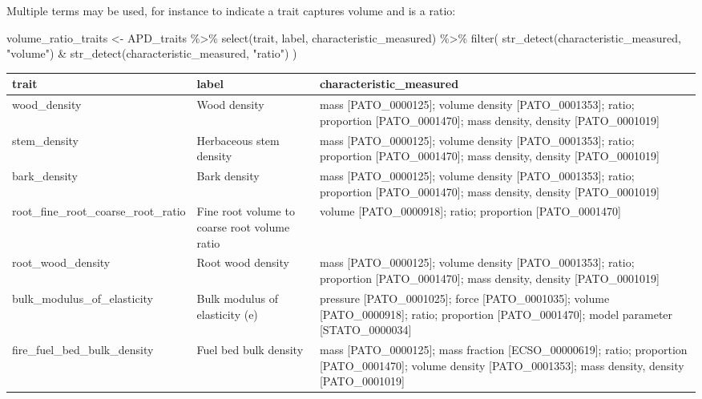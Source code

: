 \documentclass[
  letterpaper,
  DIV=11,
  numbers=noendperiod]{scrartcl}
\newenvironment{Shaded}{\begin{snugshade}}{\end{snugshade}}
\newcommand{\FunctionTok}[1]{\textcolor[rgb]{0.28,0.35,0.67}{#1}}
\newcommand{\NormalTok}[1]{\textcolor[rgb]{0.00,0.23,0.31}{#1}}
\newcommand{\OtherTok}[1]{\textcolor[rgb]{0.00,0.23,0.31}{#1}}
\newcommand{\SpecialCharTok}[1]{\textcolor[rgb]{0.37,0.37,0.37}{#1}}
\newcommand{\StringTok}[1]{\textcolor[rgb]{0.13,0.47,0.30}{#1}}
\begin{document}
Multiple terms may be used, for instance to indicate a trait captures
volume and is a ratio:

\begin{Shaded}
\begin{Highlighting}[]
\NormalTok{volume\_ratio\_traits }\OtherTok{\textless{}{-}} 
\NormalTok{  APD\_traits }\SpecialCharTok{\%\textgreater{}\%}
  \FunctionTok{select}\NormalTok{(trait, label, characteristic\_measured) }\SpecialCharTok{\%\textgreater{}\%}
  \FunctionTok{filter}\NormalTok{(}
    \FunctionTok{str\_detect}\NormalTok{(characteristic\_measured, }\StringTok{"volume"}\NormalTok{) }\SpecialCharTok{\&}
    \FunctionTok{str\_detect}\NormalTok{(characteristic\_measured, }\StringTok{"ratio"}\NormalTok{) }
\NormalTok{    )}
\end{Highlighting}
\end{Shaded}

\begin{tabular}{>{\raggedright\arraybackslash}p{6cm}>{\raggedright\arraybackslash}p{4cm}>{\raggedright\arraybackslash}p{5cm}}
\toprule
trait & label & characteristic\_measured\\
\midrule
wood\_density & Wood density & mass [PATO\_0000125]; volume density [PATO\_0001353]; ratio; proportion [PATO\_0001470]; mass density, density [PATO\_0001019]\\
stem\_density & Herbaceous stem density & mass [PATO\_0000125]; volume density [PATO\_0001353]; ratio; proportion [PATO\_0001470]; mass density, density [PATO\_0001019]\\
bark\_density & Bark density & mass [PATO\_0000125]; volume density [PATO\_0001353]; ratio; proportion [PATO\_0001470]; mass density, density [PATO\_0001019]\\
root\_fine\_root\_coarse\_root\_ratio & Fine root volume to coarse root volume ratio & volume [PATO\_0000918]; ratio; proportion [PATO\_0001470]\\
root\_wood\_density & Root wood density & mass [PATO\_0000125]; volume density [PATO\_0001353]; ratio; proportion [PATO\_0001470]; mass density, density [PATO\_0001019]\\
\addlinespace
bulk\_modulus\_of\_elasticity & Bulk modulus of elasticity (e) & pressure [PATO\_0001025]; force [PATO\_0001035]; volume [PATO\_0000918]; ratio; proportion [PATO\_0001470]; model parameter [STATO\_0000034]\\
fire\_fuel\_bed\_bulk\_density & Fuel bed bulk density & mass [PATO\_0000125]; mass fraction [ECSO\_00000619]; ratio; proportion [PATO\_0001470]; volume density [PATO\_0001353]; mass density, density [PATO\_0001019]\\
\bottomrule
\end{tabular}
\end{document}
